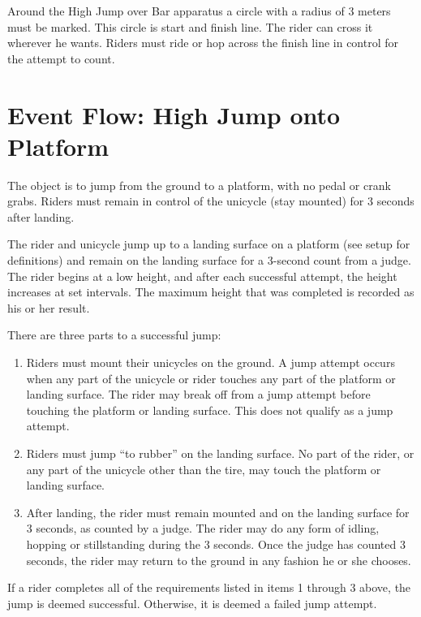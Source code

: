 Around the High Jump over Bar apparatus a circle with a radius of 3 meters must be marked.
This circle is start and finish line.
The rider can cross it wherever he wants.
Riders must ride or hop across the finish line in control for the attempt to count.

\section{Event Flow: High Jump onto Platform}
The object is to jump from the ground to a platform, with no pedal or crank grabs.
Riders must remain in control of the unicycle (stay mounted) for 3 seconds after landing.

The rider and unicycle jump up to a landing surface on a platform (see setup for definitions) and remain on the landing surface for a 3-second count from a judge.
The rider begins at a low height, and after each successful attempt, the height increases at set intervals.
The maximum height that was completed is recorded as his or her result.

There are three parts to a successful jump:
\begin{enumerate}
\item Riders must mount their unicycles on the ground.
A jump attempt occurs when any part of the unicycle or rider touches any part of the platform or landing surface.
The rider may break off from a jump attempt before touching the platform or landing surface.
This does not qualify as a jump attempt.
\item Riders must jump ``to rubber'' on the landing surface.
No part of the rider, or any part of the unicycle other than the tire, may touch the platform or landing surface.
\item After landing, the rider must remain mounted and on the landing surface for 3 seconds, as counted by a judge.
The rider may do any form of idling, hopping or stillstanding during the 3 seconds.
Once the judge has counted 3 seconds, the rider may return to the ground in any fashion he or she chooses.
\end{enumerate}
If a rider completes all of the requirements listed in items 1 through 3 above, the jump is deemed successful.
Otherwise, it is deemed a failed jump attempt.

